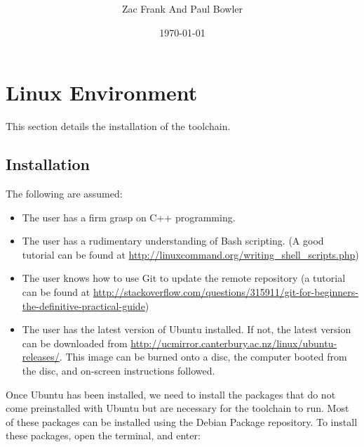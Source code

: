 \documentclass[a4paper, oneside, 11pt, titlepage, onecolumn, openright]{report}
\title{\projecttitle \\ \documenttitle}
\author{Zac Frank And Paul Bowler}
\date{\today}
\begin{document}
	\maketitle
	
	\clearpage
	\tableofcontents

	


	\clearpage

\chapter{Linux Environment}
		\label{C:Environment}

		This section details the installation of the toolchain.
		\section{Installation }
			\label{s:Installation}
			The following are assumed:
			
\begin{itemize}
			\label{Requirements}
\item The user has a firm grasp on C++ programming.

\item The user has a rudimentary understanding of Bash scripting. (A good tutorial can be found at \url{http://linuxcommand.org/writing\_shell\_scripts.php})

\item The user knows how to use Git to update the remote repository (a tutorial can be found at \url{http://stackoverflow.com/questions/315911/git-for-beginners-the-definitive-practical-guide})

\item The user has the latest version of Ubuntu installed. If not, the latest version can be downloaded from \url{http://ucmirror.canterbury.ac.nz/linux/ubuntu-releases/}. This image can be burned onto a disc, the computer booted from the disc, and on-screen instructions followed.

\end{itemize}
			Once Ubuntu has been installed, we need to install the packages that do not come preinstalled with Ubuntu but are necessary for the toolchain to run. Most of these packages can be installed using the Debian Package repository. To install these packages, open the terminal, and enter:
			
\end{document}
